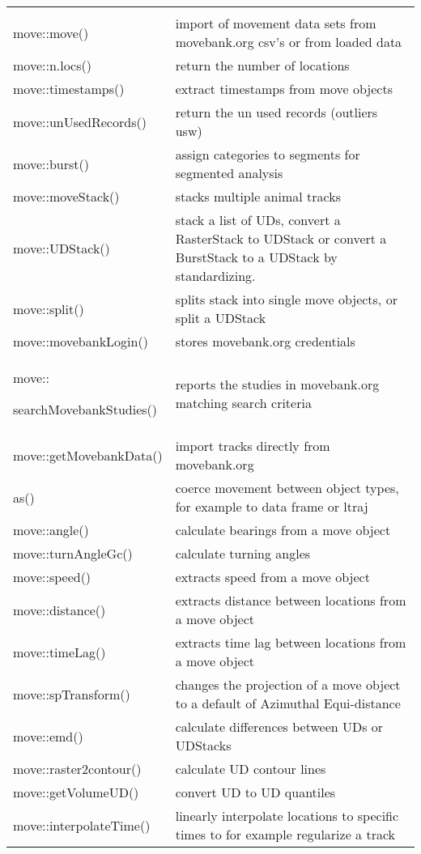 \documentclass[a4paper,10pt,landscape]{article}
\begin{document}
\begin{multicols}{3}
\begin{tabular}{@{}p{\the\MyLen}%
                @{}p{\linewidth-\the\MyLen}@{}}
                & \\
move::move() & import of movement data sets from movebank.org csv's or from loaded data \\
move::n.locs() & return the number of locations \\
move::timestamps() & extract timestamps from move objects\\
move::unUsedRecords() & return the un used records (outliers usw)\\
move::burst() & assign categories to segments for segmented analysis \\
move::moveStack() & stacks multiple animal tracks \\
move::UDStack() & stack a list of UDs, convert a RasterStack to UDStack or convert a BurstStack to a UDStack by standardizing.\\
move::split() & splits stack into single move objects, or split a UDStack \\
move::movebankLogin() & stores movebank.org credentials \\
move::\par searchMovebankStudies() & reports the studies in movebank.org matching search criteria\\
move::getMovebankData() & import tracks directly from movebank.org \\
as() & coerce movement between object types, for example to data frame or ltraj \\
move::angle() &  calculate bearings from a move object\\
move::turnAngleGc() & calculate turning angles\\
move::speed() & extracts speed from a move object \\  
move::distance() & extracts distance between locations from a move object \\
move::timeLag() & extracts time lag between locations from a move object \\
move::spTransform() & changes the projection of a move object to a default of Azimuthal Equi-distance \\
move::emd() & calculate differences between UDs or UDStacks\\
move::raster2contour() & calculate UD contour lines \\
move::getVolumeUD() & convert UD to UD quantiles \\
move::interpolateTime() & linearly interpolate locations to specific times to for example regularize a track \\

\end{tabular}
\end{multicols}
\end{document}

